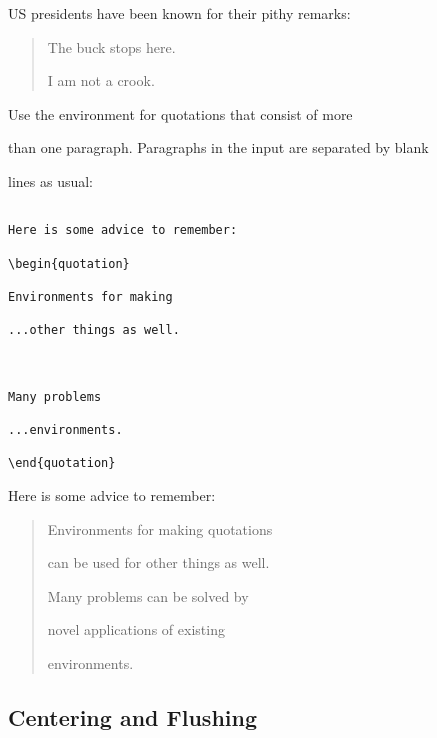 \egmid%

US presidents have been known for their pithy remarks:

\begin{quote}

The buck stops here.



I am not a crook.

\end{quote}

\egend



Use the  environment for quotations that consist of more

than one paragraph.  Paragraphs in the input are separated by blank

lines as usual:

\egstart

\begin{verbatim}

Here is some advice to remember:

\begin{quotation}

Environments for making

...other things as well.



Many problems

...environments.

\end{quotation}

\end{verbatim}

\egmid%

Here is some advice to remember:

\begin{quotation}

Environments for making quotations

can be used for other things as well.



Many problems can be solved by

novel applications of existing

environments.

\end{quotation}

\egend



\subsection{Centering and Flushing}



